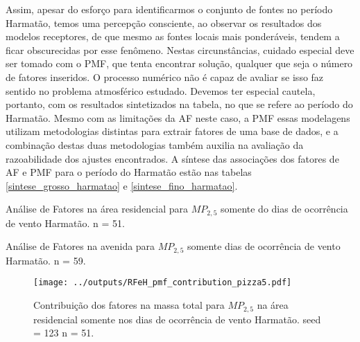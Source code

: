 Assim, apesar do esforço para identificarmos o conjunto de fontes no período 
Harmatão, temos uma percepção consciente, ao observar os resultados dos modelos 
receptores, de que mesmo as fontes locais mais ponderáveis, tendem a ficar 
obscurecidas por esse fenômeno. Nestas circunstâncias, cuidado especial deve 
ser tomado com o PMF, que tenta encontrar solução, qualquer que seja o número 
de fatores inseridos. O processo numérico não
é capaz de avaliar se isso faz sentido no problema atmosférico estudado. 
Devemos ter especial cautela, portanto, com os resultados sintetizados na 
tabela, no que se refere ao período do Harmatão. Mesmo com as limitações da 
AF neste caso, a PMF essas modelagens utilizam metodologias distintas para 
extrair fatores de uma base de dados, e a combinação destas duas 
metodologias também auxilia na avaliação da razoabilidade dos ajustes 
encontrados. A síntese das associações dos fatores de AF e PMF para o período do Harmatão 
estão nas tabelas \ref{sintese_grosso_harmatao} e \ref{sintese_fino_harmatao}.

\newpage
\begin{table}[H]
  \centering
  
  \caption{Análise de Fatores na área residencial para $MP_{2,5}$
           somente do dias de ocorrência de vento Harmatão. n = 51.
          \label{table:AF_RFeH5}}
\end{table}

\begin{table}[H]
  \centering
  
  \caption{Análise de Fatores na avenida para $MP_{2,5}$
           somente dias de ocorrência de vento Harmatão. n = 59.
          \label{table:AF_TFeH5}}
\end{table}

\begin{landscape}
  \begin{figure}
    \centering
    \begin{minipage}[b]{0.45\linewidth}
      \texttt{[image: ../outputs/RFeH\_pmf\_contribution\_pizza5.pdf]}
      \caption{Contribuição dos fatores na massa total para $MP_{2,5}$ na área
               residencial somente nos dias de ocorrência de vento Harmatão. seed = 123 n = 51.
               \label{fig:RFeH_contribution5}}
    \end{minipage}%
    \hspace{0.5cm}
    \begin{minipage}[b]{0.45\linewidth}
      
    \end{minipage}
  \end{figure}
\end{landscape}


